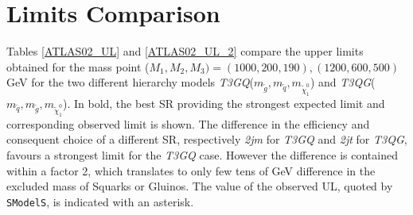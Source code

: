 \documentclass[a4paper,11pt]{article}
\newcommand{\SMO}{\texttt{SModelS\xspace}}
\begin{document}
\section{Limits Comparison}\label{app:ul}
Tables \ref{ATLAS02_UL} and \ref{ATLAS02_UL_2}  compare the upper limits obtained for the mass point ($M_1,M_2,M_3) = (1000,200,190),(1200,600,500)$ GeV for the two different hierarchy models \textit{T3GQ}($m_{\tilde g}, m_{\tilde q}, m_{\tilde \chi _1 ^0 }$) and \textit{T3QG}($m_{\tilde q}, m_{\tilde g}, m_{\tilde \chi _1 ^0 }$). In bold, the best SR providing the strongest expected limit and corresponding observed limit is shown. The difference in the efficiency and consequent choice of a different SR, respectively \textit{2jm} for \textit{T3GQ} and \textit{2jt} for \textit{T3QG}, favours a strongest limit for the \textit{T3GQ} case. However the difference is contained within a factor 2, which translates to only few tens of GeV difference in the excluded mass of Squarks or Gluinos. The value of the observed UL, quoted by \SMO, is indicated with an asterisk. 
\end{document}

